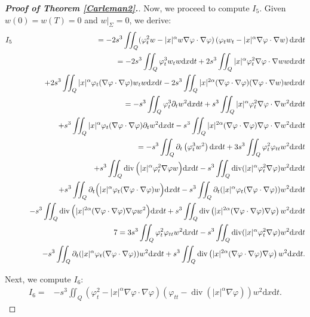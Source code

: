 \documentclass[11pt]{article}
\numberwithin{equation}{section}
\def\pt{\partial}
\def\vp{\varphi}
\def\bf{\textbf}
\def\pt{\partial}
\def\al{\alpha}
\def\df{\mathrm d}
\DeclareMathOperator{\Div}{div}
\begin{document}
\begin{proof}[{\rm \bf { Proof of  Theorem \ref{Carleman2}.}}]
			
			
			Now, we proceed to compute $I_5$. Given  $w(0)=w(T)=0$ and $ w|_{\Sigma}=0$, we derive:
			\begin{eqnarray*}
				I_5
				&&=-2s^3\iint_Q(\vp_t^2w-|x|^\al w\nabla\vp\cdot \nabla\vp)\left(\vp_t w_t-|x|^\al \nabla\vp\cdot \nabla w\right)\df x\df t\\
				&&=-2s^3\iint_Q\vp_t^3w_tw\df x\df t+2s^3\iint_Q|x|^\al \vp_t^2\nabla \vp\cdot \nabla w w\df x\df t\\
				&&\hspace{4.5mm}+2s^3\iint_Q |x|^\al \vp_t(\nabla \vp\cdot \nabla \vp)w_t w\df x\df t-2s^3\iint_Q |x|^{2\al}(\nabla\vp\cdot \nabla\vp)(\nabla \vp\cdot \nabla w)w\df x\df t \\
				&&=-s^3\iint_Q\vp_t^3\pt_tw^2\df x\df t+s^3\iint_Q|x|^\al\vp_t^2\nabla \vp\cdot \nabla w^2\df x\df t\\
				&&\hspace{4.5mm}+s^3\iint_Q|x|^\al \vp_t(\nabla\vp\cdot \nabla\vp)\pt_tw^2\df x\df t-s^3\iint_Q|x|^{2\al}(\nabla\vp\cdot \nabla\vp)\nabla\vp\cdot \nabla w^2\df x\df t\\
				&&=-s^3\iint_Q\pt_t\left(\vp_t^3w^2\right)\df x\df t+3s^3\iint_Q \vp_t^2\vp_{tt}w^2\df x\df t\\
				&&\hspace{4.5mm}+s^3\iint_Q\Div\Big(|x|^\al \vp_t^2\nabla \vp w\Big)\df x\df t-s^3\iint_Q\Div(|x|^\al \vp_t^2\nabla \vp)w^2\df x\df t\\
				&&\hspace{4.5mm}+s^3\iint_Q\pt_t\Big(|x|^\al\vp_t(\nabla\vp\cdot \nabla \vp) w\Big)\df x\df t-s^3\iint_Q\pt_t(|x|^\al \vp_t(\nabla \vp\cdot \nabla \vp))w^2\df x\df t\\
				&&\hspace{4.5mm}-s^3\iint_Q\Div\Big(|x|^{2\al}(\nabla\vp\cdot \nabla\vp)\nabla\vp w^2\Big)\df x\df t+s^3\iint_Q\Div\left(|x|^{2\al}(\nabla\vp\cdot \nabla\vp)\nabla\vp\right)w^2\df x\df t\\
				&&7=3s^3\iint_Q \vp_t^2\vp_{tt}w^2\df x\df t-s^3\iint_Q\Div(|x|^\al \vp_t^2\nabla \vp)w^2\df x\df t\\
				&&\hspace{4.5mm}-s^3\iint_Q\pt_t(|x|^\al \vp_t(\nabla \vp\cdot \nabla \vp))w^2\df x\df t+s^3\iint_Q\Div\left(|x|^{2\al}(\nabla\vp\cdot \nabla\vp)\nabla\vp\right)w^2\df x\df t.
			\end{eqnarray*}
			
			Next, we compute $I_6$:
			\begin{equation*}
				\begin{split}
					I_6=&-s^3\iint_Q\left(\vp_t^2-|x|^\al \nabla\vp\cdot \nabla\vp\right) \left(\vp_{tt}-\Div (|x|^\al \nabla\vp)\right)w^2 \df x\df t.
				\end{split}
			\end{equation*}
			

\end{proof}
\end{document}
